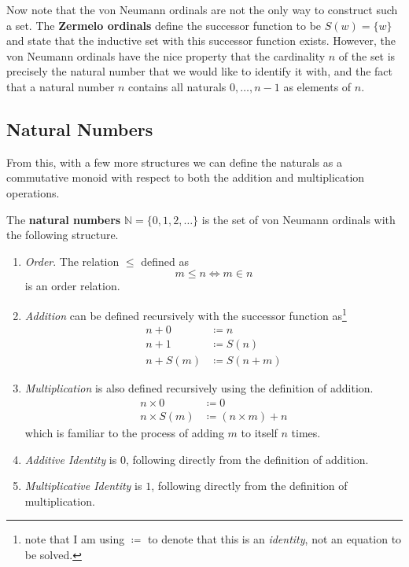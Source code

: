   Now note that the von Neumann ordinals are not the only way to construct such a set. The \textbf{Zermelo ordinals} define the successor function to be $S(w) = \{w\}$ and state that the inductive set with this successor function exists. However, the von Neumann ordinals have the nice property that the cardinality $n$ of the set is precisely the natural number that we would like to identify it with, and the fact that a natural number $n$ contains all naturals $0, \ldots, n-1$ as elements of $n$. 

\subsection{Natural Numbers}

  From this, with a few more structures we can define the naturals as a commutative monoid with respect to both the addition and multiplication operations.

  \begin{definition}
    \label{naturals}
    The \textbf{natural numbers} $\mathbb{N} = \{0, 1, 2, \ldots\}$ is the set of von Neumann ordinals with the following structure. 
    \begin{enumerate}
      \item \textit{Order}. The relation $\leq$ defined as 
      \begin{equation}
        m \leq n \iff m \in n
      \end{equation}
      is an order relation. 

      \item \textit{Addition} can be defined recursively with the successor function as\footnote{note that I am using $\coloneqq$ to denote that this is an \textit{identity}, not an equation to be solved.}
      \begin{align}
        n + 0 & \coloneqq n \\
        n + 1 & \coloneqq S(n) \\  
        n + S(m) & \coloneqq S(n + m)
      \end{align}

      \item \textit{Multiplication} is also defined recursively using the definition of addition.  
      \begin{align}
        n \times 0 & \coloneqq 0 \\
        n \times S(m) & \coloneqq (n \times m) + n
      \end{align}
      which is familiar to the process of adding $m$ to itself $n$ times. 

      \item \textit{Additive Identity} is $0$, following directly from the definition of addition. 
      \item \textit{Multiplicative Identity} is $1$, following directly from the definition of multiplication. 
    \end{enumerate}
  \end{definition} 

